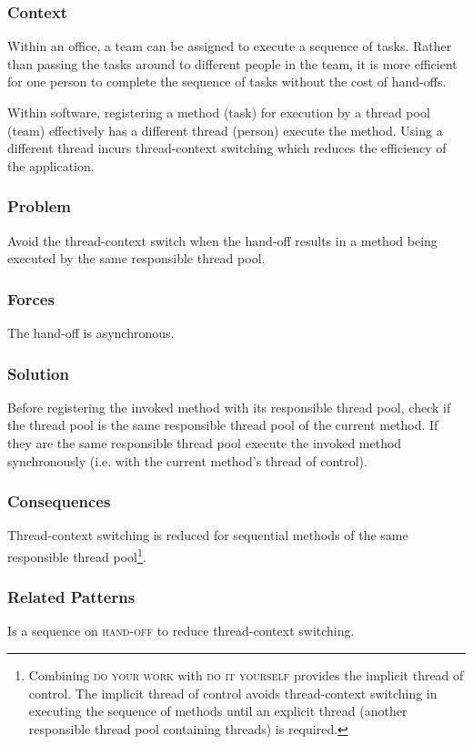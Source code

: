 \documentclass[prodmode]{style/acmlarge}
\begin{document}
\subsubsection*{Context} Within an office, a team can be assigned to execute a
sequence of tasks.  Rather than passing the tasks around to different people in
the team, it is more efficient for one person to complete the sequence of tasks
without the cost of hand-offs.

Within software, registering a method (task) for execution by a thread pool
(team) effectively has a different thread (person) execute the method.  Using a
different thread incurs thread-context switching which reduces the efficiency of
the application.

\subsubsection*{Problem} Avoid the thread-context switch when the hand-off
results in a method being executed by the same responsible thread pool.

\subsubsection*{Forces} The hand-off is asynchronous.

\subsubsection*{Solution} Before registering the invoked method with its
responsible thread pool, check if the thread pool is the same responsible thread
pool of the current method.  If they are the same responsible thread pool
execute the invoked method synchronously (i.e. with the current method's thread
of control).

\subsubsection*{Consequences} Thread-context switching is reduced for sequential
methods of the same responsible thread pool\footnote{Combining \textsc{do your
work} with \textsc{do it yourself} provides the implicit thread of control.  The
implicit thread of control avoids thread-context switching in executing the
sequence of methods until an explicit thread (another responsible thread pool
containing threads) is required.}.

\subsubsection*{Related Patterns} Is a sequence on \textsc{hand-off} to reduce
thread-context switching.
\end{document}
